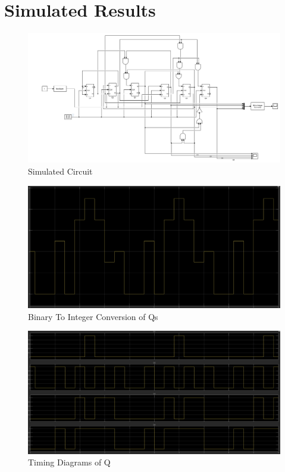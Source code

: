 \documentclass{article}
\begin{document}
\section{Simulated Results}
\begin{figure}[!htb]
    \includegraphics[width=\textwidth]{SImCircFinal.PNG}
    \caption{Simulated Circuit}
\end{figure}
\begin{figure}[!htb]
    \includegraphics[width=\textwidth]{NumbersOutput.PNG}
    \caption{Binary To Integer Conversion of Qs}
    \label{fig:BitToIntQ}
\end{figure}
\begin{figure}[!htb]
    \includegraphics[width=\textwidth]{QTimings.PNG}
    \caption{Timing Diagrams of Q}
\end{figure}
\end{document}
